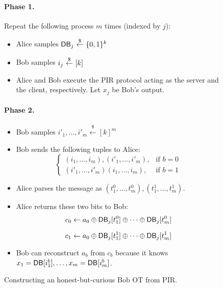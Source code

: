 \begin{figure}

\begin{minipage}{\textwidth}
\begin{mdframed}
\paragraph{Phase 1.} 
Repeat the following process $m$ times (indexed by $j$):
\begin{itemize}
    \item Alice samples ${\sf DB}_j ~{\overset{\$}{\leftarrow}}~ \{0,1\}^k$
    \item Bob samples $ i_j ~{\overset{\$}{\leftarrow}}~ [k]$
    \item Alice and Bob execute the PIR protocol acting as the server and the client, respectively. Let $x_j$ be Bob's output.
\end{itemize}

\paragraph{Phase 2.} 
\begin{itemize}
    \item Bob samples \( i'_1, \ldots, i'_m \stackrel{\$}{\leftarrow} [k]^m \)
    \item Bob sends the following tuples to Alice:
        \[
        \left\{
          \begin{array}{ll}
            (i_1, \ldots, i_m), (i'_1, \ldots, i'_m), & \text{if } b = 0 \\
            (i'_1, \ldots, i'_m)(i_1, \ldots, i_m), & \text{if } b = 1
          \end{array}
        \right.
        \]
    \item Alice parses the message as $(t^0_1, \ldots, t^0_m), (t^1_1, \ldots, t^1_m)$.
    \item Alice returns these two bits to Bob:
    \[
    c_0\leftarrow a_0\oplus {\sf DB}_{j}[t^0_1] \oplus \dots \oplus {\sf DB}_{j}[t^0_m]
    \]

    \[
    c_1\leftarrow a_0\oplus {\sf DB}_{j}[t^1_1] \oplus \dots \oplus {\sf DB}_{j}[t^1_m]
    \]
    
    \item  Bob can reconstruct $a_b$ from $c_b$ because it knows $x_1={\sf DB}[i^b_1],\dots,x_m={\sf DB}[i^b_m]$.
    
\end{itemize}

\end{mdframed}
\end{minipage}
\caption{Constructing an honest-but-curious Bob OT from PIR. \label{fig:OT-from-PIR}}
\end{figure}

